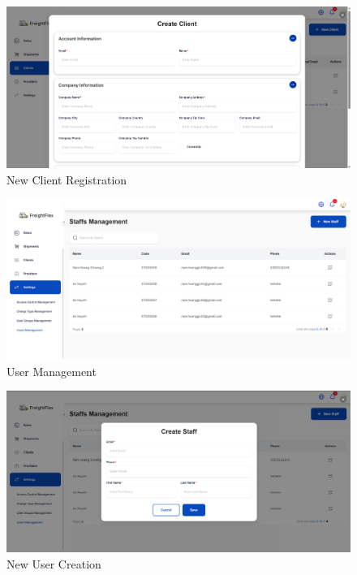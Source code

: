 \begin{figure}[H]
    \centering
    \includegraphics[width=15cm]{graphics/UI/new_client.png}
    \caption{New Client Registration}
    \label{fig:new-client}
\end{figure}

\begin{figure}[H]
    \centering
    \includegraphics[width=15cm]{graphics/UI/user-management.png}
    \caption{User Management}
    \label{fig:user-management}
\end{figure}

\begin{figure}[H]
    \centering
    \includegraphics[width=15cm]{graphics/UI/new-user.png}
    \caption{New User Creation}
    \label{fig:new-user}
\end{figure}

